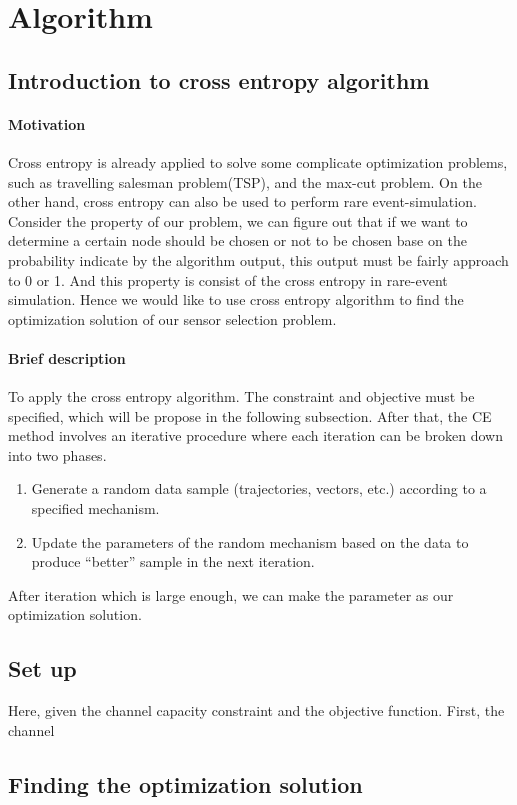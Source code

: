 \section{Algorithm}
\subsection{Introduction to cross entropy algorithm}
\paragraph{Motivation}
Cross entropy is already applied to solve some complicate optimization problems, such as travelling salesman problem(TSP), and  the max-cut problem. On the other hand, cross entropy can also be used to perform rare event-simulation. Consider the property of our problem, we can figure out that if we want to determine a certain node should be chosen or not to be chosen base on the probability indicate by the algorithm output, this output must be fairly approach to 0 or 1. And this property is 
consist of the cross entropy in rare-event simulation. Hence we would like to use cross entropy algorithm to find the optimization solution of our sensor selection problem. 
\paragraph{Brief description}
To apply the cross entropy algorithm. The constraint and objective must be specified, which will be 
propose in the following subsection. After that, the CE method involves an iterative procedure where each iteration can be broken down into two phases.

\begin{enumerate}
\item Generate a random data sample (trajectories, vectors, etc.) according to a specified mechanism.
\item Update the parameters of the random mechanism based on the data to produce “better” sample 
in the next iteration.
\end{enumerate}  
After iteration which is large enough, we can make the parameter as our optimization solution.

\subsection{Set up}
Here, given the channel capacity constraint and the objective function. First, the channel 
\subsection{Finding the optimization solution}


